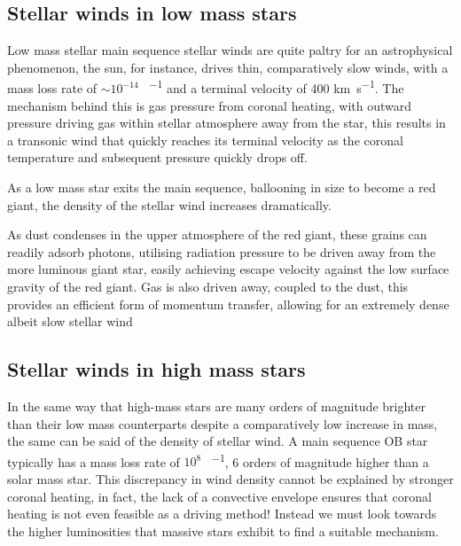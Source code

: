 \subsection{Stellar winds in low mass stars}
\label{sec:lowmasswinds}



Low mass stellar main sequence stellar winds are quite paltry for an astrophysical phenomenon, the sun, for instance, drives thin, comparatively slow winds, with a mass loss rate of $\sim 10^{-14}$ \si{\solarmass\per\year} and a terminal velocity of 400 \si{\kilo\metre\per\second}. The mechanism behind this is gas pressure from coronal heating, with outward pressure driving gas within stellar atmosphere away from the star, this results in a transonic wind that quickly reaches its terminal velocity as the coronal temperature and subsequent pressure quickly drops off.



As a low mass star exits the main sequence, ballooning in size to become a red giant, the density of the stellar wind increases dramatically. 

As dust condenses in the upper atmosphere of the red giant, these grains can readily adsorb photons, utilising radiation pressure to be driven away from the more luminous giant star, easily achieving escape velocity against the low surface gravity of the red giant.
Gas is also driven away, coupled to the dust, this provides an efficient form of momentum transfer, allowing for an extremely dense albeit slow stellar wind

\label{sec:dustdriven}

\subsection{Stellar winds in high mass stars}
\label{sec:radlinedriving}

In the same way that high-mass stars are many orders of magnitude brighter than their low mass counterparts despite a comparatively low increase in mass, the same can be said of the density of stellar wind. A main sequence OB star typically has a mass loss rate of $10^{8}$ \si{\solarmass\per\year}, 6 orders of magnitude higher than a solar mass star.
This discrepancy in wind density cannot be explained by stronger coronal heating, in fact, the lack of a convective envelope ensures that coronal heating is not even feasible as a driving method!
Instead we must look towards the higher luminosities that massive stars exhibit to find a suitable mechanism.

